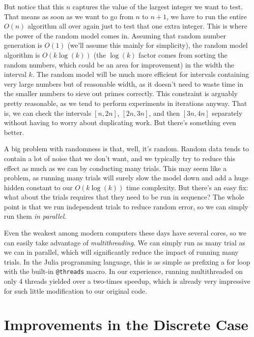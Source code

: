 \documentclass[conference]{IEEEtran}
\begin{document}
But notice that this $n$ captures the value of the largest
integer we want to test. That means as soon as we want
to go from $n$ to $n + 1$, we have to run the entire
$O(n)$ algorithm all over again just to test that one
extra integer. This is where the power of the random
model comes in. Assuming that random number generation
is $O(1)$ (we'll assume this mainly for simplicity),
the random model algorithm is $O(k \log(k))$ (the
$\log(k)$ factor comes from sorting the random numbers,
which could be an area for improvement) in the
width the interval $k$. The random model will be much
more efficient for intervals containing very large
numbers but of reasonable width, as it doesn't need to
waste time in the smaller numbers to sieve out primes
correctly. This constraint is arguably pretty reasonable,
as we tend to perform experiments in iterations anyway.
That is, we can check the intervals $[n, 2n]$, $[2n, 3n]$,
and then $[3n, 4n]$ separately without having to worry
about duplicating work. But there's something even better.

A big problem with randomness is that, well, it's random.
Random data tends to contain a lot of noise that we don't
want, and we typically try to reduce this effect as much
as we can by conducting many trials. This may seem like
a problem, as running many trials will surely slow the
model down and add a huge hidden constant to our
$O(k \log(k))$ time complexity. But there's an easy fix:
what about the trials requires that they need to be run
in sequence? The whole point is that we run independent
trials to reduce random error, so we can simply
run them \textit{in parallel}.

Even the weakest among modern computers these days have
several cores, so we can easily take advantage of
\textit{multithreading}. We can simply run as many trial
as we can in parallel, which will significantly reduce
the impact of running many trials. In the Julia
programming language, this is as simple as
prefixing a for loop with the built-in
\verb|@threads| macro. In our experience, running
multithreaded on only 4 threads yielded over a
two-times speedup, which is already very impressive
for such little modification to our original code.

\section{Improvements in the Discrete Case}
\end{document}

